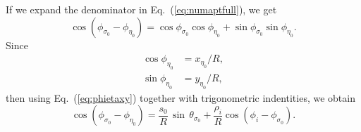 \documentclass[a4paper,twocolumn,superscriptaddress]{revtex4-1}
\begin{document}
{If we expand the denominator in Eq.~(\ref{eq:numaptfull}), we get
\begin{equation}
\cos (\phi_{ \sigma_0 } - \phi_{ \eta_0 }) = \cos \phi_{ \sigma_0 } \cos \phi_{ \eta_0 } + \sin \phi_{ \sigma_0 } \sin \phi_{ \eta_0 } .
\end{equation}
Since
\begin{subequations}
\begin{align}
\cos \phi_{\eta_0} &= {x_{\eta_0} /R} ,
\\
\sin \phi_{\eta_0} &= {y_{\eta_0} /R},
\end{align}
\end{subequations}
then using Eq.~(\ref{eq:phietaxy}) together with trigonometric indentities, we obtain
\begin{equation}
\label{eq:numaptdenom}
\cos (\phi_{ \sigma_0 } - \phi_{ \eta_0 }) = 
\dfrac{s_0}{R}\, \sin\, \theta_{ \sigma_0 } + \dfrac{\rho_i}{R} \cos (\phi_i - \phi_{ \sigma_0 }) .
\end{equation}

}
\end{document}
